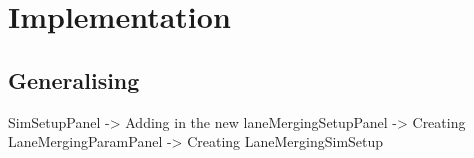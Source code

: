 \chapter{Implementation}
\label{cha:Implementation}

\section{Generalising}
\label{sec:Generalising}

SimSetupPanel -> Adding in the new laneMergingSetupPanel
			  -> Creating LaneMergingParamPanel
			  -> Creating LaneMergingSimSetup